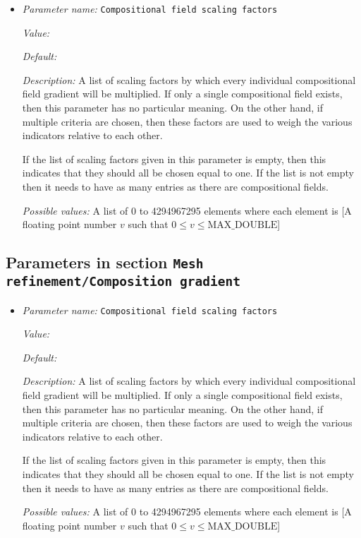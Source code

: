 \begin{itemize}
\item {\it Parameter name:} {\tt Compositional field scaling factors}
\label{parameters:Mesh refinement/Composition approximate gradient/Compositional field scaling factors}


{\it Value:} 


{\it Default:} 


{\it Description:} A list of scaling factors by which every individual compositional field gradient will be multiplied. If only a single compositional field exists, then this parameter has no particular meaning. On the other hand, if multiple criteria are chosen, then these factors are used to weigh the various indicators relative to each other. 

If the list of scaling factors given in this parameter is empty, then this indicates that they should all be chosen equal to one. If the list is not empty then it needs to have as many entries as there are compositional fields.


{\it Possible values:} A list of 0 to 4294967295 elements where each element is [A floating point number $v$ such that $0 \leq v \leq \text{MAX\_DOUBLE}$]
\end{itemize}

\subsection{Parameters in section \tt Mesh refinement/Composition gradient}
\label{parameters:Mesh_20refinement/Composition_20gradient}

\begin{itemize}
\item {\it Parameter name:} {\tt Compositional field scaling factors}
\label{parameters:Mesh refinement/Composition gradient/Compositional field scaling factors}


{\it Value:} 


{\it Default:} 


{\it Description:} A list of scaling factors by which every individual compositional field gradient will be multiplied. If only a single compositional field exists, then this parameter has no particular meaning. On the other hand, if multiple criteria are chosen, then these factors are used to weigh the various indicators relative to each other. 

If the list of scaling factors given in this parameter is empty, then this indicates that they should all be chosen equal to one. If the list is not empty then it needs to have as many entries as there are compositional fields.


{\it Possible values:} A list of 0 to 4294967295 elements where each element is [A floating point number $v$ such that $0 \leq v \leq \text{MAX\_DOUBLE}$]
\end{itemize}

